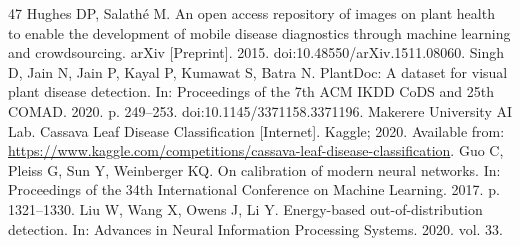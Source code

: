 \documentclass[12pt]{article}
\begin{document}
\begin{thebibliography}{47}
 Hughes DP, Salathé M. An open access repository of images on plant health to enable the development of mobile disease diagnostics through machine learning and crowdsourcing. arXiv [Preprint]. 2015. doi:10.48550/arXiv.1511.08060.
 Singh D, Jain N, Jain P, Kayal P, Kumawat S, Batra N. PlantDoc: A dataset for visual plant disease detection. In: Proceedings of the 7th ACM IKDD CoDS and 25th COMAD. 2020. p. 249--253. doi:10.1145/3371158.3371196.
 Makerere University AI Lab. Cassava Leaf Disease Classification [Internet]. Kaggle; 2020. Available from: \url{https://www.kaggle.com/competitions/cassava-leaf-disease-classification}.
 Guo C, Pleiss G, Sun Y, Weinberger KQ. On calibration of modern neural networks. In: Proceedings of the 34th International Conference on Machine Learning. 2017. p. 1321--1330.
 Liu W, Wang X, Owens J, Li Y. Energy-based out-of-distribution detection. In: Advances in Neural Information Processing Systems. 2020. vol. 33.

\end{thebibliography}
\end{document}
